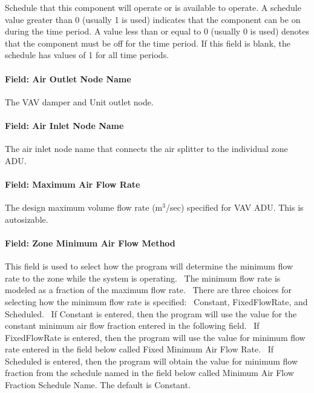 Schedule that this component will operate or is available to operate. A schedule value greater than 0 (usually 1 is used) indicates that the component can be on during the time period. A value less than or equal to 0 (usually 0 is used) denotes that the component must be off for the time period. If this field is blank, the schedule has values of 1 for all time periods.

\paragraph{Field: Air Outlet Node Name}\label{field-air-outlet-node-name-4}

The VAV damper and Unit outlet node.

\paragraph{Field: Air Inlet Node Name}\label{field-air-inlet-node-name-4}

The air inlet node name that connects the air splitter to the individual zone ADU.

\paragraph{Field: Maximum Air Flow Rate}\label{field-maximum-air-flow-rate-4}

The design maximum volume flow rate (m\(^{3}\)/sec) specified for VAV ADU. This is autosizable.

\paragraph{Field: Zone Minimum Air Flow Method}\label{field-zone-minimum-air-flow-method-1}

This field is used to select how the program will determine the minimum flow rate to the zone while the system is operating.~ The minimum flow rate is modeled as a fraction of the maximum flow rate.~ There are three choices for selecting how the minimum flow rate is specified:~ Constant, FixedFlowRate, and Scheduled.~ If Constant is entered, then the program will use the value for the constant minimum air flow fraction entered in the following field.~ If FixedFlowRate is entered, then the program will use the value for minimum flow rate entered in the field below called Fixed Minimum Air Flow Rate.~ If Scheduled is entered, then the program will obtain the value for minimum flow fraction from the schedule named in the field below called Minimum Air Flow Fraction Schedule Name. The default is Constant.

